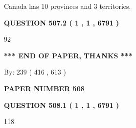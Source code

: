 \documentclass[12pt]{article}
\begin{document}
  
 
 
\noindent{}
 
 
Canada has 10  provinces and 3 territories.
 
 
 
 
  
\vspace{0.2in}
  
{\textbf{\Large{QUESTION
507.2 
 ( 1 , 1 , 6791 )
}}}
  
  
 
 
\noindent{}

92
 
 
   
   
 \vspace{0.2in}
 
   
   
   
   
\vspace{1.0in} 
{\textbf{\large{ *** END OF PAPER, THANKS *** }}} 
   
   
\hspace{1.0in} By: 
 239 ( 416 ,  613 )
   
   
   
   
\newpage 
\setcounter{page}{ 
   508001 } 
   
   
   
   
 {\textbf{ \Large{ PAPER NUMBER  508  }}}
   
   
\vspace{0.2in}
   
   
   
   
   
   
 \vspace{0.2in}
 
 
 
 
   
   
  
\vspace{0.2in}
  
{\textbf{\Large{QUESTION
508.1 
 ( 1 , 1 , 6791 )
}}}
  
  
 
 
\noindent{}

118
 
\end{document}
